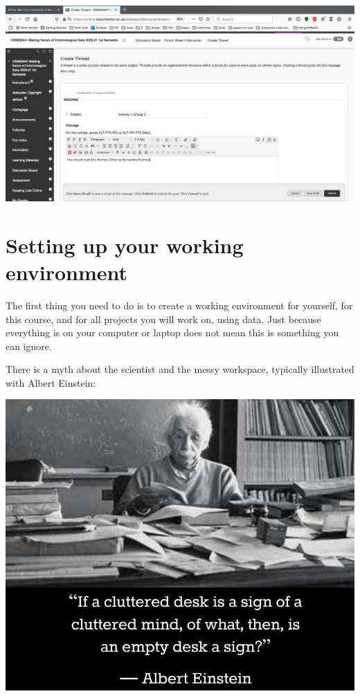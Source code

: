\documentclass[
]{book}
\begin{document}
\includegraphics{imgs/db_activity.png}

\hypertarget{setting-up-your-working-environment}{%
\section{Setting up your working environment}\label{setting-up-your-working-environment}}

The first thing you need to do is to create a working environment for yourself, for this course, and for all projects you will work on, using data. Just because everything is on your computer or laptop does not mean this is something you can ignore.

There is a myth about the scientist and the messy workspace, typically illustrated with Albert Einstein:

\includegraphics[width=13.33in]{imgs/einstein_desk}
\end{document}
